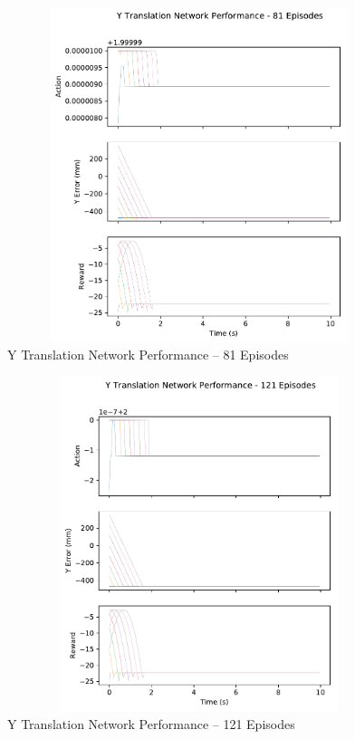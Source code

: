 \begin{figure}[H]
	\centering
	\includegraphics[width=6in, height=3.85in, keepaspectratio]{figures/train_figs/transy_transitions/2_81.pdf}
	\caption{Y Translation Network Performance -- 81 Episodes}
\end{figure}
\begin{figure}[H]
	\centering
	\includegraphics[width=6in, height=3.85in, keepaspectratio]{figures/train_figs/transy_transitions/2_121.pdf}
	\caption{Y Translation Network Performance -- 121 Episodes}
\end{figure}
